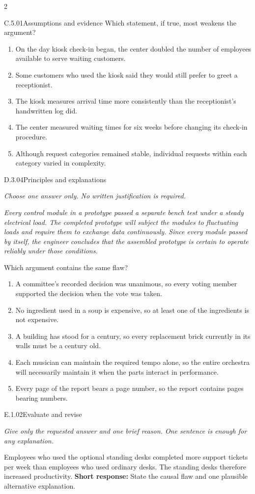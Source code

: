 \documentclass[9pt]{extarticle}
\newcommand{\choice}[1]{\item #1}
\begin{document}
\begin{multicols}{2}
\begin{DenseCoreProblem}{C.5.01}{Assumptions and evidence}
Which statement, if true, most weakens the argument?
\begin{enumerate}[label=(\alph*)]
  \choice{On the day kiosk check-in began, the center doubled the number of employees available to serve waiting customers.}
  \choice{Some customers who used the kiosk said they would still prefer to greet a receptionist.}
  \choice{The kiosk measures arrival time more consistently than the receptionist's handwritten log did.}
  \choice{The center measured waiting times for six weeks before changing its check-in procedure.}
  \choice{Although request categories remained stable, individual requests within each category varied in complexity.}
\end{enumerate}
\end{DenseCoreProblem}
\begin{DenseCoreProblem}{D.3.04}{Principles and explanations}
{\scriptsize\textit{Choose one answer only. No written justification is required.}\par}
\emph{Every control module in a prototype passed a separate bench test under a steady electrical load. The completed prototype will subject the modules to fluctuating loads and require them to exchange data continuously. Since every module passed by itself, the engineer concludes that the assembled prototype is certain to operate reliably under those conditions.}

Which argument contains the same flaw?
\begin{enumerate}[label=(\alph*)]
  \choice{A committee's recorded decision was unanimous, so every voting member supported the decision when the vote was taken.}
  \choice{No ingredient used in a soup is expensive, so at least one of the ingredients is not expensive.}
  \choice{A building has stood for a century, so every replacement brick currently in its walls must be a century old.}
  \choice{Each musician can maintain the required tempo alone, so the entire orchestra will necessarily maintain it when the parts interact in performance.}
  \choice{Every page of the report bears a page number, so the report contains pages bearing numbers.}
\end{enumerate}
\end{DenseCoreProblem}
\begin{DenseCoreProblem}{E.1.02}{Evaluate and revise}
{\scriptsize\textit{Give only the requested answer and one brief reason. One sentence is enough for any explanation.}\par}
Employees who used the optional standing desks completed more support tickets per week than employees who used ordinary desks. The standing desks therefore increased productivity.
\textbf{Short response:} State the causal flaw and one plausible alternative explanation.
\end{DenseCoreProblem}
\end{multicols}
\end{document}
